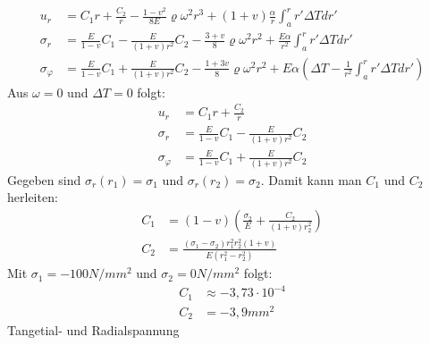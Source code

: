 \documentclass[]{article}
\begin{document}
\begin{center}
\end{center}
\begin{align*}
u_r&=C_1r+\frac{C_2}{r}-\frac{1-v^2}{8E}\varrho\omega^2r^3+(1+v)\frac{\alpha}{r}\int_{a}^{r}r'\Delta Tdr'\\
\sigma_r&=\frac{E}{1-v}C_1-\frac{E}{(1+v)r^2}C_2-\frac{3+v}{8}\varrho\omega^2r^2+\frac{E\alpha}{r^2}\int_{a}^{r}r'\Delta Tdr'\\
\sigma_\varphi&=\frac{E}{1-v}C_1+\frac{E}{(1+v)r^2}C_2-\frac{1+3v}{8}\varrho\omega^2r^2+E\alpha(\Delta T-\frac{1}{r^2}\int_{a}^{r}r'\Delta Tdr')
\end{align*}
Aus $\omega=0$ und $\Delta T=0$ folgt:
\begin{align*}
u_r&=C_1r+\frac{C_2}{r}\\
\sigma_r&=\frac{E}{1-v}C_1-\frac{E}{(1+v)r^2}C_2\\
\sigma_\varphi&=\frac{E}{1-v}C_1+\frac{E}{(1+v)r^2}C_2
\end{align*}
Gegeben sind $\sigma_r(r_1)=\sigma_1$ und $\sigma_r(r_2)=\sigma_2$. Damit kann man $C_1$ und $C_2$  herleiten:
\begin{align*}
C_1&=(1-v)\left( \frac{\sigma_2}{E}+\frac{C_2}{(1+v)r_2^2}\right) \\
C_2&=\frac{(\sigma_1-\sigma_2)r_1^2r_2^2(1+v)}{E(r_1^2-r_2^2)}
\end{align*}
Mit $\sigma_1=-100N/mm^2$ und $\sigma_2=0N/mm^2$ folgt:
\begin{align*}
C_1&\approx-3,73\cdot 10^{-4}\\
C_2&=-3,9mm^2
\end{align*}
\def\CA{-0.000373} %
\def\CB{-3.9} %
\def\E{4000}
\def\sigR{(\CA/0.7-\CB/(1.3*((x*25)+75)*((x*25)+75)))}
\def\sigP{(\CA/0.7+\CB/(1.3*((x*25)+75)*((x*25)+75)))}
\def\sigT{-106.7/200000}
Tangetial- und Radialspannung\\
\vspace{1cm}\\
\end{document}
